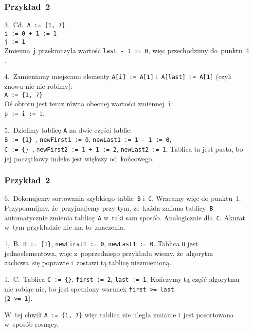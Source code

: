 \documentclass[10pt,t]{beamer}
\begin{document}
\begin{frame}
  \frametitle{Przykład~2}


  3.~Cd.~\texttt{A := \{1, 7\} } \\
  \texttt{i := 0 + 1 := 1} \\
  \texttt{j := 1} \\
  Zmienna \texttt{j} przekroczyła wartość \texttt{last - 1 := 0}, więc
  przechodzimy do~punktu~$4$.

  4.~Zamieniamy miejscami elementy \texttt{A[i] := A[1]}
  i~\texttt{A[last] := A[1]} (czyli znowu nic nie robimy): \\
  \texttt{A := \{1, 7\} } \\
  Oś obrotu jest teraz równa obecnej wartości zmiennej~\texttt{i}: \\
  \texttt{p := i := 1}.

  5.~Dzielimy tablicę \texttt{A} na dwie części tablic: \\
  \texttt{B := \{1\} }, \texttt{newFirst1 := 0},
  \texttt{newLast1 := 1 - 1 := 0}, \\
  \texttt{C := \{\} }, \texttt{newFirst2 := 1 + 1 := 2},
  \texttt{newLast2 := 1}. Tablica ta jest pusta, bo jej początkowy indeks
  jest większy od~końcowego.

\end{frame}





\begin{frame}
  \frametitle{Przykład~2}


  6.~Dokonujemy sortowania szybkiego tablic~\texttt{B} i~\texttt{C}. Wracamy
  więc do punktu~$1$. Przypomnijmy, że~przyjmujemy przy tym, że~każda zmiana
  tablicy~\texttt{B} automatycznie zmienia tablicę~\texttt{A} w~taki
  sam sposób. Analogicznie dla~\texttt{C}. Akurat w~tym przykładzie nie ma
  to~znaczenia.

  1,~B.~\texttt{B := \{1\}}, \texttt{newFirst1 := 0},
  \texttt{newLast1 := 0}. Tablica \texttt{B} jest jednoelementowa, więc
  z~poprzedniego przykładu wiemy, że~algorytm zachowa~się poprawie
  i~zostawi tą tablicę niezmienioną.

  1,~C.~Tablica \texttt{C := \{\}}, \texttt{first := 2},
  \texttt{last := 1}. Kończymy tą część algorytmu nie robiąc nic, bo jest
  spełniony warunek \texttt{first >= last} \\
  (\texttt{2 >= 1}).

  W~tej chwili \texttt{A := \{1, 7\}} więc tablica nie uległa zmianie
  i~jest posortowana w~sposób rosnący.

\end{frame}
\end{document}
